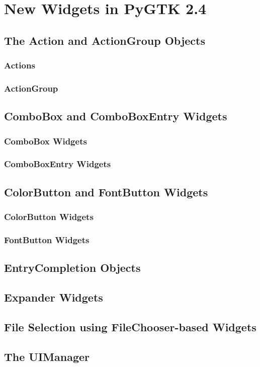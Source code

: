\chapter{New Widgets in PyGTK 2.4}
\section{The Action and ActionGroup Objects}
	\subsection{Actions}
	\subsection{ActionGroup}
\section{ComboBox and ComboBoxEntry Widgets}
	\subsection{ComboBox Widgets}
	\subsection{ComboBoxEntry Widgets}
\section{ColorButton and FontButton Widgets}
	\subsection{ColorButton Widgets}
	\subsection{FontButton Widgets}
\section{EntryCompletion Objects}
\section{Expander Widgets}
\section{File Selection using FileChooser-based Widgets}
\section{The UIManager}

